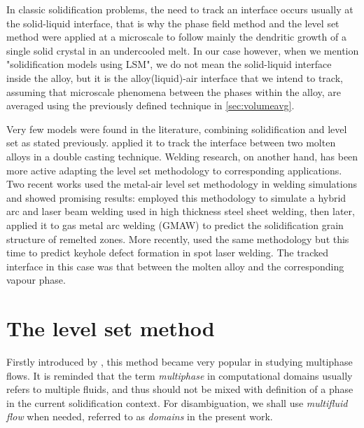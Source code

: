In classic solidification problems, the need to track an interface occurs usually at the solid-liquid interface, that is why the phase field
method \citep{karma_phase-field_1996,boettinger_phase-field_2002} and the level set method \citep{chen_simple_1997,gibou_level_2003,tan_level_2007} 
were applied at a microscale to follow mainly the dendritic growth of a single solid crystal in an undercooled melt.
In our case however, when we mention "solidification models using LSM", we 
do not mean the solid-liquid interface inside the alloy, but it is the alloy(liquid)-air interface that we intend to track, assuming that microscale
phenomena between the phases within the alloy, are averaged using the previously defined technique in \cref{sec:volumeavg}.

Very few models were found in the literature, combining solidification and level set as stated previously. 
\citet{du_simulating_2001} applied it to track the interface between two molten alloys in a double casting technique. 
Welding research, on another hand, has been more active adapting the level set methodology to corresponding applications. 
Two recent works used the metal-air level set methodology in welding simulations and showed promising results: 
\citet{desmaison_level_2014} employed this methodology to simulate a hybrid arc and laser beam welding 
used in high thickness steel sheet welding, then later, \citet{chen_three_2014} applied it to gas metal arc welding (GMAW) to predict 
the solidification grain structure of remelted zones.
More recently, \citet{courtois_complete_2014} used the same methodology but this time to predict keyhole defect formation
in spot laser welding. The tracked interface in this case was that between the molten alloy and the corresponding vapour phase.
%
%
\section{The level set method}
Firstly introduced by \citet{osher_fronts_1988}, this method became very popular in studying multiphase flows.
It is reminded that the term \emph{multiphase} in computational domains usually refers to multiple fluids, and thus
should not be mixed with definition of a phase in the current solidification context. For disambiguation, we shall
use \emph{multifluid flow} when needed, referred to as \emph{domains} in the present work.

